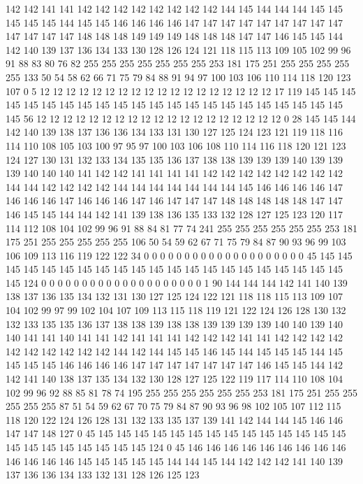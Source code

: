 142 142 141 141 142 142 142 142 142 142 142 142 144 145 144 144 144 145 145 145
145 145 144 145 145 146 146 146 146 147 147 147 147 147 147 147 147 147 147 147
147 147 148 148 148 149 149 149 148 148 148 147 147 146 145 145 144 142 140 139
137 136 134 133 130 128 126 124 121 118 115 113 109 105 102 99 96 91 88 83
80 76 82 255 255 255 255 255 255 255 253 181 175 251 255 255 255 255 255 133
50 54 58 62 66 71 75 79 84 88 91 94 97 100 103 106 110 114 118 120
123 107 0 5 12 12 12 12 12 12 12 12 12 12 12 12 12 12 12 12
12 12 17 119 145 145 145 145 145 145 145 145 145 145 145 145 145 145 145 145
145 145 145 145 145 145 145 56 12 12 12 12 12 12 12 12 12 12 12 12
12 12 12 12 12 12 12 0 28 145 145 144 142 140 139 138 137 136 136 134
133 131 130 127 125 124 123 121 119 118 116 114 110 108 105 103 100 97 95 97
100 103 106 108 110 114 116 118 120 121 123 124 127 130 131 132 133 134 135 135
136 137 138 138 139 139 139 140 139 139 139 140 140 140 141 142 142 141 141 141
141 142 142 142 142 142 142 142 142 144 144 142 142 142 142 144 144 144 144 144
144 144 145 146 146 146 146 147 146 146 146 147 146 146 146 147 146 147 147 147
148 148 148 148 148 147 147 146 145 145 144 144 142 141 139 138 136 135 133 132
128 127 125 123 120 117 114 112 108 104 102 99 96 91 88 84 81 77 74 241
255 255 255 255 255 255 253 181 175 251 255 255 255 255 255 106 50 54 59 62
67 71 75 79 84 87 90 93 96 99 103 106 109 113 116 119 122 122 34 0
0 0 0 0 0 0 0 0 0 0 0 0 0 0 0 0 0 0 0 45
145 145 145 145 145 145 145 145 145 145 145 145 145 145 145 145 145 145 145 145
145 145 124 0 0 0 0 0 0 0 0 0 0 0 0 0 0 0 0 0
0 0 0 1 90 144 144 144 142 141 140 139 138 137 136 135 134 132 131 130
127 125 124 122 121 118 118 115 113 109 107 104 102 99 97 99 102 104 107 109
113 115 118 119 121 122 124 126 128 130 132 132 133 135 135 136 137 138 138 139
138 138 139 139 139 139 140 140 139 140 140 141 141 140 141 141 142 141 141 141
142 142 142 141 141 142 142 142 142 142 142 142 142 142 142 144 142 144 145 145
146 145 144 145 145 145 144 145 145 145 145 146 146 146 146 147 147 147 147 147
147 147 146 145 145 144 142 142 141 140 138 137 135 134 132 130 128 127 125 122
119 117 114 110 108 104 102 99 96 92 88 85 81 78 74 195 255 255 255 255
255 255 253 181 175 251 255 255 255 255 255 87 51 54 59 62 67 70 75 79
84 87 90 93 96 98 102 105 107 112 115 118 120 122 124 126 128 131 132 133
135 137 139 141 142 144 144 145 146 146 147 147 148 127 0 45 145 145 145 145
145 145 145 145 145 145 145 145 145 145 145 145 145 145 145 145 145 145 124 0
45 146 146 146 146 146 146 146 146 146 146 146 146 146 145 145 145 145 145 144
144 145 144 142 142 142 141 140 139 137 136 136 134 133 132 131 128 126 125 123
